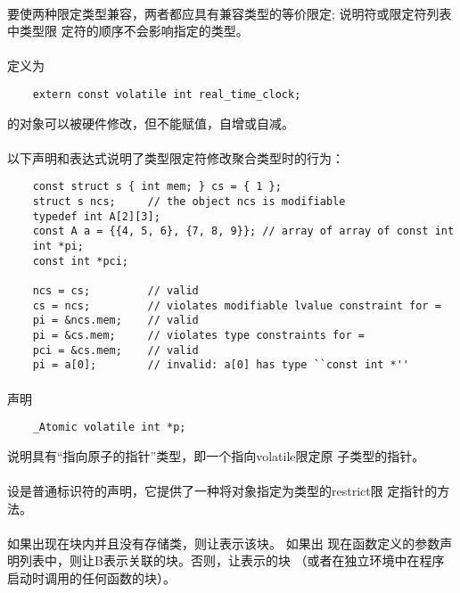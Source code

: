 {\paragraph{}
要使两种限定类型兼容，两者都应具有兼容类型的等价限定; 说明符或限定符列表中类型限
定符的顺序不会影响指定的类型。

\paragraph{}
\ex 定义为
\begin{lstlisting}
    extern const volatile int real_time_clock;
\end{lstlisting}
的对象可以被硬件修改，但不能赋值，自增或自减。

\paragraph{}
\ex 以下声明和表达式说明了类型限定符修改聚合类型时的行为：
\begin{lstlisting}
    const struct s { int mem; } cs = { 1 };
    struct s ncs;     // the object ncs is modifiable
    typedef int A[2][3];
    const A a = {{4, 5, 6}, {7, 8, 9}}; // array of array of const int
    int *pi;
    const int *pci;

    ncs = cs;         // valid
    cs = ncs;         // violates modifiable lvalue constraint for =
    pi = &ncs.mem;    // valid
    pi = &cs.mem;     // violates type constraints for =
    pci = &cs.mem;    // valid
    pi = a[0];        // invalid: a[0] has type ``const int *''
\end{lstlisting}

\paragraph{}
\ex 声明
\begin{lstlisting}
    _Atomic volatile int *p;
\end{lstlisting}
说明具有``指向原子的指针''类型，即一个指向volatile限定原
子类型的指针。

\paragraph{}
设是普通标识符的声明，它提供了一种将对象指定为类型的restrict限
定指针的方法。

\paragraph{}
如果出现在块内并且没有存储类，则让表示该块。 如果出
现在函数定义的参数声明列表中，则让B表示关联的块。否则，让表示的块
（或者在独立环境中在程序启动时调用的任何函数的块）。

}
